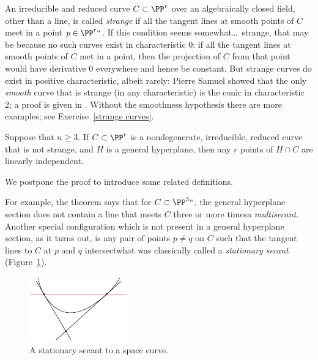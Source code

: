 An irreducible and reduced curve
$C\subset \PP^r$ over an algebraically closed field, 
other than a
%
line, is called \emph{strange} if
all the tangent lines at smooth points of $C$ meet in a point $p\in \PP^r``$. 
If this condition seems somewhat\dots\ strange, that may be because no
such curves exist in characteristic 0: if 
all the
tangent lines at smooth points of $C$ met in a point, then the projection
of $C$ from that point would have derivative 0 everywhere and hence be
constant. But strange curves do exist in 
positive
characteristic, albeit
%
rarely: Pierre Samuel showed that the only \emph{smooth} curve that is
strange (in any characteristic) is the conic in 
characteristic 2;
%
a proof
is given in \cite[Theorem IV.3.9]{Hartshorne1977}. Without the smoothness
hypothesis there are more examples; see Exercise~\ref{strange curves}.



\begin{npt}
\begin{theorem}
\label{basic linear independence}\label{linear general position}
%
Suppose that $n\geq 3$. If $C\subset \PP^r$ is a nondegenerate,
irreducible, reduced curve
that is not strange,
and $H$ is a general hyperplane, then any $r$ points of $H\cap C$ are
linearly independent.
\unif
\end{theorem}
\end{npt}

We postpone the proof to introduce some related definitions.

For example, the theorem says that for $C \subset \PP^3` `$, the general
hyperplane section does not contain a line
%
that meets $C$ three or more times\emdash a \emph{multisecant}. Another
special configuration which is not present in a general hyperplane
section, as it turns out,
is any pair of points $p\neq q$ on $C$ such that the tangent lines
to $C$ at $p$ and $q$ intersect\emdash what was
classically
%
called a 
\textit{stationary secant}
(Figure~\ref{Fig9.1}).

\begin{figure}
\vskip-3pt
\includegraphics[height=1.1in,angle=-20]{"main/Fig09-1"}
\vskip-22pt
\caption{A stationary secant to a space curve.}
\label{Fig9.1}
\end{figure}

